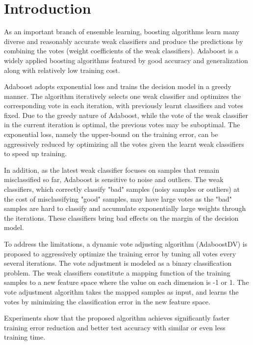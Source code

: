 \section{Introduction}

As an important branch of ensemble learning, boosting algorithms learn many diverse and reasonably accurate weak classifiers and produce the predictions by combining the votes (weight coefficients of the weak classifiers). Adaboost is a widely applied boosting algorithms featured by good accuracy and generalization along with relatively low training cost.

Adaboost adopts exponential loss and trains the decision model in a greedy manner. The algorithm iteratively selects one weak classifier and optimizes the corresponding vote in each iteration, with previously learnt classifiers and votes fixed. Due to the greedy nature of Adaboost, while the vote of the weak classifier in the current iteration is optimal, the previous votes may be suboptimal. The exponential loss, namely the upper-bound on the training error, can be aggressively reduced by optimizing all the votes given the learnt weak classifiers to speed up training.

In addition, as the latest weak classifier focuses on samples that remain misclassified so far, Adaboost is sensitive to noise and outliers. The weak classifiers, which correctly classify "bad" samples (noisy samples or outliers) at the cost of misclassifying "good" samples, may have large votes as the "bad" samples are hard to classify and accumulate exponentially large weights through the iterations. These classifiers bring bad effects on the margin of the decision model.

To address the limitations, a dynamic vote adjusting algorithm (AdaboostDV) is proposed to aggressively optimize the training error by tuning all votes every several iterations. The vote adjustment is modeled as a binary classification problem. The weak classifiers constitute a mapping function of the training samples to a new feature space where the value on each dimension is -1 or 1. The vote adjustment algorithm takes the mapped samples as input, and learns the votes by minimizing the classification error in the new feature space.

Experiments show that the proposed algorithm achieves significantly faster training error reduction and better test accuracy with similar or even less training time.